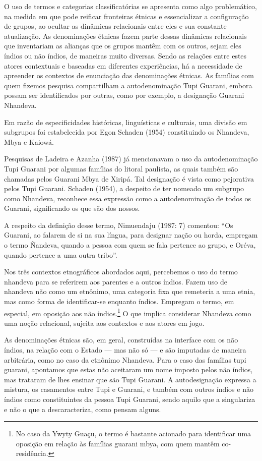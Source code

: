 {{O uso de termos e categorias classificatórias se apresenta como algo
problemático, na medida em que pode reificar fronteiras étnicas e
essencializar a configuração de grupos, ao ocultar as dinâmicas
relacionais entre eles e sua constante atualização. As denominações
étnicas fazem parte dessas dinâmicas relacionais que inventariam as
alianças que os grupos mantêm com os outros, sejam eles índios ou não
índios, de maneiras muito diversas. Sendo as relações entre estes
atores contextuais e baseadas em diferentes experiências, há a
necessidade de apreender os contextos de enunciação das denominações
étnicas. As famílias com quem fizemos pesquisa compartilham a
autodenominação Tupi Guarani, embora possam ser identificados por
outras, como por exemplo, a designação Guarani Nhandeva.

Em razão de especificidades históricas, linguísticas e culturais, uma
divisão em subgrupos foi estabelecida por Egon Schaden (1954)
constituindo os Nhandeva, Mbya e Kaiowá.

Pesquisas de Ladeira e Azanha (1987) já mencionavam o uso da
autodenominação Tupi Guarani por algumas famílias do litoral paulista,
as quais também são chamadas pelos Guarani Mbya de Xiripá. Tal
designação é vista como pejorativa pelos Tupi Guarani. Schaden (1954),
a despeito de ter nomeado um subgrupo como Nhandeva, reconhece essa
expressão como a autodenominação de todos os Guarani, significando os
que são dos nossos.

A respeito da definição desse termo, Nimuendaju (1987: 7) comentou: ``Os
Guarani, ao falarem de si na sua língua, para designar nação ou horda,
empregam o termo Ñandeva, quando a pessoa com quem se fala pertence ao
grupo, e Oréva, quando pertence a uma outra tribo''.

Nos três contextos etnográficos abordados aqui, percebemos o uso do
termo nhandeva para se referirem aos parentes e a outros índios. Fazem
uso de nhandeva não como um etnônimo, uma categoria fixa que remeteria
a uma etnia, mas como forma de identificar-se enquanto índios. Empregam
o termo, em especial, em oposição aos não índios.\footnote{No caso da
Ywyty Guaçu, o termo é bastante acionado para identificar uma oposição
em relação às famílias guarani mbya, com quem mantêm co-residência.} O
que implica considerar Nhandeva como uma noção relacional, sujeita aos
contextos e aos atores em jogo.

As denominações étnicas são, em geral, construídas na interface com os
não índios, na relação com o Estado --- mas não só --- e são imputadas de
maneira arbitrária, como no caso da etnônimo Nhandeva. Para o caso das
famílias tupi guarani, apontamos que estas não aceitaram um nome
imposto pelos não índios, mas trataram de lhes ensinar que são Tupi
Guarani. A autodesignação expressa a mistura, os casamentos entre Tupi
e Guarani, e também com outros índios e não índios como constituintes
da pessoa Tupi Guarani, sendo aquilo que a singulariza e não o que a
descaracteriza, como pensam alguns.

}}
